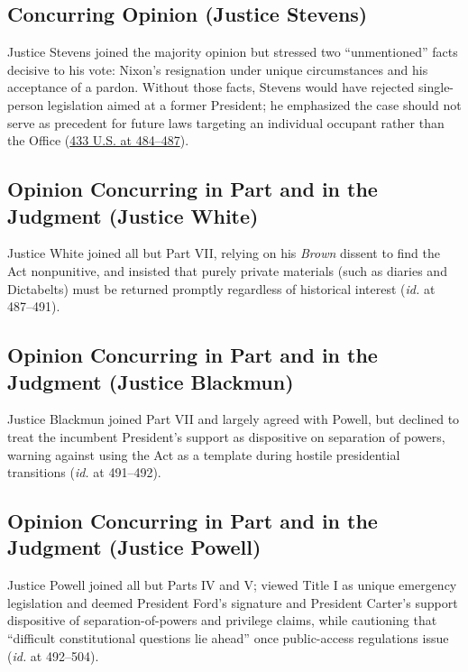 \documentclass[12pt]{article}
\begin{document}
\subsection{Concurring Opinion (Justice Stevens)}

Justice Stevens joined the majority opinion but stressed two ``unmentioned'' facts decisive to his vote: Nixon's resignation under unique circumstances and his acceptance of a pardon. Without those facts, Stevens would have rejected single-person legislation aimed at a former President; he emphasized the case should not serve as precedent for future laws targeting an individual occupant rather than the Office (\href{https://supreme.justia.com/cases/federal/us/433/425/}{433 U.S. at 484--487}).

\subsection{Opinion Concurring in Part and in the Judgment (Justice White)}

Justice White joined all but Part VII, relying on his \textit{Brown} dissent to find the Act nonpunitive, and insisted that purely private materials (such as diaries and Dictabelts) must be returned promptly regardless of historical interest (\textit{id.} at 487--491).

\subsection{Opinion Concurring in Part and in the Judgment (Justice Blackmun)}

Justice Blackmun joined Part VII and largely agreed with Powell, but declined to treat the incumbent President's support as dispositive on separation of powers, warning against using the Act as a template during hostile presidential transitions (\textit{id.} at 491--492).

\subsection{Opinion Concurring in Part and in the Judgment (Justice Powell)}

Justice Powell joined all but Parts IV and V; viewed Title I as unique emergency legislation and deemed President Ford's signature and President Carter's support dispositive of separation-of-powers and privilege claims, while cautioning that ``difficult constitutional questions lie ahead'' once public-access regulations issue (\textit{id.} at 492--504).
\end{document}
